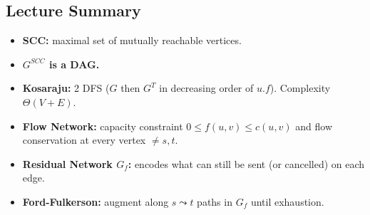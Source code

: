 \subsection{Lecture Summary}

\begin{tcolorbox}[colback=lightblue, colframe=keyblue, fonttitle=\bfseries,
                  title={Key Points}]
\begin{itemize}[noitemsep]
  \item \textbf{SCC:} maximal set of mutually reachable vertices.
  \item \textbf{$G^{SCC}$ is a DAG.}
  \item \textbf{Kosaraju:} 2 DFS ($G$ then $G^T$ in decreasing order of $u.f$).
        Complexity $\Theta(V+E)$.
  \item \textbf{Flow Network:} capacity constraint $0 \le f(u,v) \le c(u,v)$
        and flow conservation at every vertex $\ne s, t$.
  \item \textbf{Residual Network $G_f$:} encodes what can still be sent
        (or cancelled) on each edge.
  \item \textbf{Ford-Fulkerson:} augment along $s \leadsto t$ paths in
        $G_f$ until exhaustion.
\end{itemize}
\end{tcolorbox}